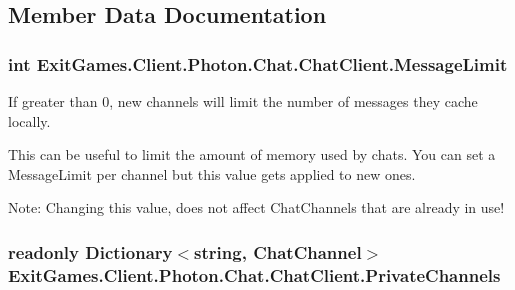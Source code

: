 \subsection{Member Data Documentation}
\subsubsection[{\texorpdfstring{Message\+Limit}{MessageLimit}}]{\setlength{\rightskip}{0pt plus 5cm}int Exit\+Games.\+Client.\+Photon.\+Chat.\+Chat\+Client.\+Message\+Limit}\hypertarget{class_exit_games_1_1_client_1_1_photon_1_1_chat_1_1_chat_client_a66e028cd73b441bbdd8d37ee0e2b1dee}{}\label{class_exit_games_1_1_client_1_1_photon_1_1_chat_1_1_chat_client_a66e028cd73b441bbdd8d37ee0e2b1dee}


If greater than 0, new channels will limit the number of messages they cache locally. 

This can be useful to limit the amount of memory used by chats. You can set a Message\+Limit per channel but this value gets applied to new ones.

Note\+: Changing this value, does not affect Chat\+Channels that are already in use! 
\subsubsection[{\texorpdfstring{Private\+Channels}{PrivateChannels}}]{\setlength{\rightskip}{0pt plus 5cm}readonly Dictionary$<$string, {\bf Chat\+Channel}$>$ Exit\+Games.\+Client.\+Photon.\+Chat.\+Chat\+Client.\+Private\+Channels}\hypertarget{class_exit_games_1_1_client_1_1_photon_1_1_chat_1_1_chat_client_a25f9db0c022bb0feda81d31f43053a81}{}\label{class_exit_games_1_1_client_1_1_photon_1_1_chat_1_1_chat_client_a25f9db0c022bb0feda81d31f43053a81}
